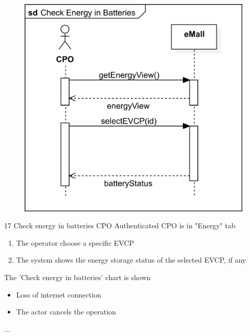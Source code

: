 \pagebreak
\usecase
{
    \begin{figure}[H]
        \centering
        \includegraphics[scale=0.9]{src/sequence_diagram/checkEnergy.png}
    \end{figure}
}
{17}
{Check energy in batteries} %
{CPO} %
{Authenticated CPO is in "Energy" tab} %
{ %
    \begin{enumerate}
        \item The operator choose a specific EVCP
        \item The system shows the energy storage status of the selected EVCP, if any
    \end{enumerate}
}
{The 'Check energy in batteries' chart is shown} %
{ %
    \begin{itemize}
        \item Loss of internet connection
        \item The actor cancels the operation
    \end{itemize}
}
{ %
    ...
}

